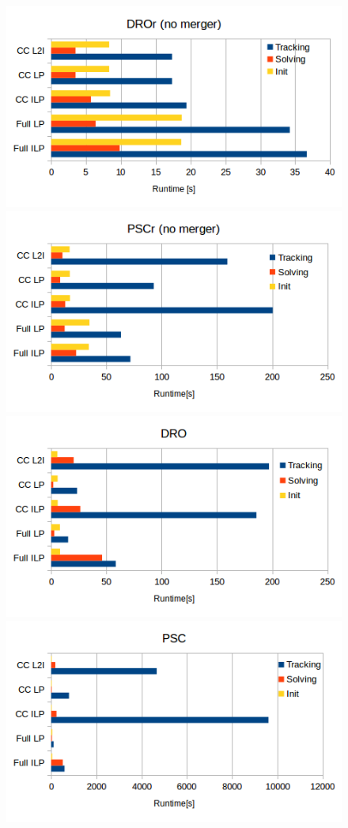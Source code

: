 \documentclass[10pt,twocolumn,letterpaper]{article}
\begin{document}
\begin{figure}[t]
  \begin{center}
  	\includegraphics[width=\linewidth]{dror.png}
  	\includegraphics[width=\linewidth]{pscr.png}
  	\includegraphics[width=\linewidth]{dro.png}
  	\includegraphics[width=\linewidth]{psc.png}

\end{center}
\end{figure}
\end{document}
